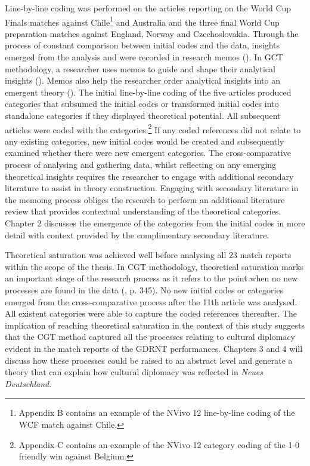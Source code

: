 Line-by-line coding was performed on the articles reporting on the World Cup Finals matches against Chile\footnote{Appendix B contains an example of the NVivo 12 line-by-line coding of the WCF match against Chile.} and Australia and the three final World Cup preparation matches against England, Norway and Czechoslovakia. Through the process of constant comparison between initial codes and the data, insights emerged from the analysis and were recorded in research memos (\cite{charmaz2014}). In GCT methodology, a researcher uses memos to guide and shape their analytical insights (\cite{charmaz2014}). Memos also help the researcher order analytical insights into an emergent theory (\cite{charmaz2014}). The initial line-by-line coding of the five articles produced categories that subsumed the initial codes or transformed initial codes into standalone categories if they displayed theoretical potential. All subsequent articles were coded with the categories.\footnote{Appendix C contains an example of the NVivo 12 category coding of the 1-0 friendly win against Belgium.} If any coded references did not relate to any existing categories, new initial codes would be created and subsequently examined whether there were new emergent categories. The cross-comparative process of analysing and gathering data, whilst reflecting on any emerging theoretical insights requires the researcher to engage with additional secondary literature to assist in theory construction. Engaging with secondary literature in the memoing process obliges the research to perform an additional literature review that provides contextual understanding of the theoretical categories. Chapter 2 discusses the emergence of the categories from the initial codes in more detail with context provided by the complimentary secondary literature.

Theoretical saturation was achieved well before analysing all 23 match reports within the scope of the thesis. In CGT methodology, theoretical saturation marks an important stage of the research process as it refers to the point when no new processes are found in the data (\cite{charmaz2014}, p. 345). No new initial codes or categories emerged from the cross-comparative process after the 11th article was analysed. All existent categories were able to capture the coded references thereafter. The implication of reaching theoretical saturation in the context of this study suggests that the CGT method captured all the processes relating to cultural diplomacy evident in the match reports of the GDRNT performances. Chapters 3 and 4 will discuss how these processes could be raised to an abstract level and generate a theory that can explain how cultural diplomacy was reflected in \textit{Neues Deutschland}. 

